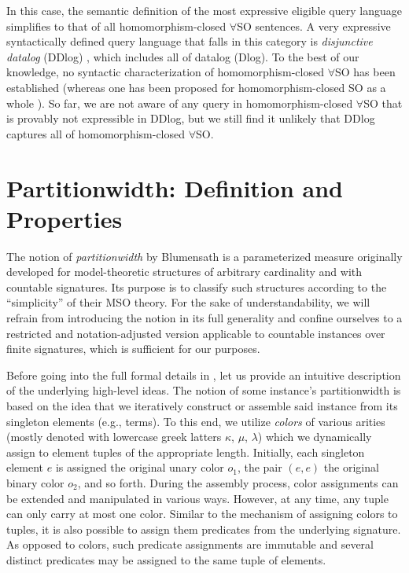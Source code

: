 \documentclass[10pt,a4paper]{amsart}
\theoremstyle{definition}
\numberwithin{equation}{section}
\theoremstyle{plain}
\theoremstyle{definition}
\theoremstyle{myexample}
\theoremstyle{plain}
\theoremstyle{definition}
\newcommand{\origcol}{o}
\newcommand{\Partitionwidth}{Par\-ti\-tion\-width}
\newcommand{\partitionwidth}{par\-ti\-tion\-width}
\begin{document}

\medskip {}
In this case, the semantic definition of the most expressive eligible query language simplifies to that of all homomorphism-closed $\forall$SO sentences. A very expressive syntactically defined query language that falls in this category is \emph{disjunctive datalog} (DDlog) \cite{EiterGM97}, which includes all of datalog (Dlog). 
To the best of our knowledge, no syntactic characterization of homomorphism-closed $\forall$SO has been established (whereas one has been proposed for homomorphism-closed SO as a whole \cite[Cor. 61]{BodirskyFKR21}).
So far, we are not aware of any query in homomorphism-closed $\forall$SO that is provably not expressible in DDlog, but we still find it unlikely that DDlog captures all of homomorphism-closed $\forall$SO.  


\section{\Partitionwidth{}: Definition and Properties}\label{sec:partitionwidth}

The notion of \emph{\partitionwidth{}} by Blumensath \cite{Blumensath03,Blumensath06} is a parameterized measure originally developed for model-theoretic structures of arbitrary cardinality and with countable signatures. Its purpose is to classify such structures according to the ``simplicity'' of their MSO theory. For the sake of understandability, we will refrain from introducing the notion in its full generality and confine ourselves to a restricted and notation-adjusted version applicable to countable instances over finite signatures, which is sufficient for our purposes. 

Before going into the full formal details in , let us provide an intuitive description of the underlying high-level ideas.
%
%
The notion of some instance's partitionwidth is based on the idea that we iteratively construct or assemble said instance 
from its singleton elements (e.g., terms). To this end, we utilize \emph{colors} of various arities (mostly denoted with lowercase greek latters $\kappa$, $\mu$, $\lambda$) which we dynamically assign to element tuples of the appropriate length. Initially, each singleton element $e$ is assigned the original unary color $\origcol_1$, the pair $(e,e)$ the original binary color $\origcol_2$, and so forth. During the assembly process, color assignments can be extended and manipulated in various ways. However, at any time, any tuple can only carry at most one color. Similar to the mechanism of assigning colors to tuples, it is also possible to assign them predicates from the underlying signature. As opposed to colors, such predicate assignments are immutable and several distinct predicates may be assigned to the same tuple of elements.
\end{document}

